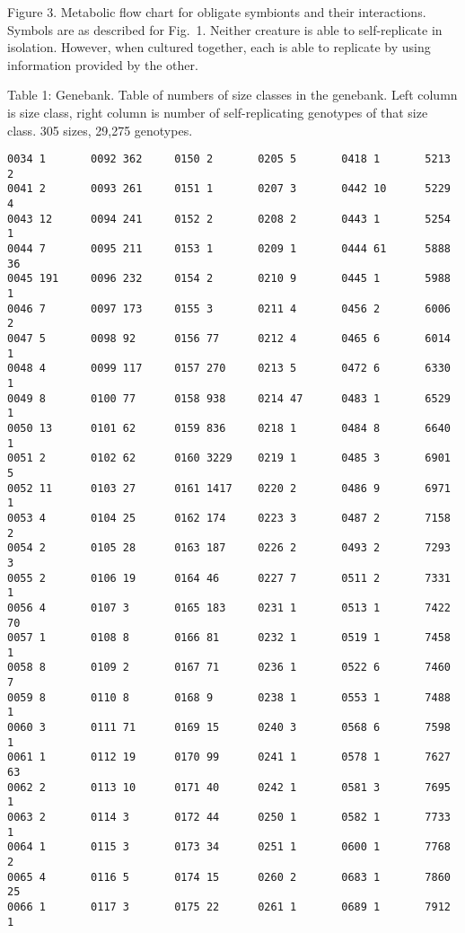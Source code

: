 \newpage
\addtocounter{page}{1}

Figure 3.  Metabolic flow chart for obligate symbionts and their interactions.
Symbols are as described for Fig.\ 1.  Neither creature is able to
self-replicate in isolation.  However, when cultured together, each is able to
replicate by using information provided by the other.

\newpage
\addtocounter{page}{1}

Table 1:  Genebank.  Table of numbers of size classes in the genebank.  Left
column is size class, right column is number of self-replicating genotypes
of that size class.  305 sizes, 29,275 genotypes.
\eLP

\begin{verbatim}
0034 1       0092 362     0150 2       0205 5       0418 1       5213 2
0041 2       0093 261     0151 1       0207 3       0442 10      5229 4
0043 12      0094 241     0152 2       0208 2       0443 1       5254 1
0044 7       0095 211     0153 1       0209 1       0444 61      5888 36
0045 191     0096 232     0154 2       0210 9       0445 1       5988 1
0046 7       0097 173     0155 3       0211 4       0456 2       6006 2
0047 5       0098 92      0156 77      0212 4       0465 6       6014 1
0048 4       0099 117     0157 270     0213 5       0472 6       6330 1
0049 8       0100 77      0158 938     0214 47      0483 1       6529 1
0050 13      0101 62      0159 836     0218 1       0484 8       6640 1
0051 2       0102 62      0160 3229    0219 1       0485 3       6901 5
0052 11      0103 27      0161 1417    0220 2       0486 9       6971 1
0053 4       0104 25      0162 174     0223 3       0487 2       7158 2
0054 2       0105 28      0163 187     0226 2       0493 2       7293 3
0055 2       0106 19      0164 46      0227 7       0511 2       7331 1
0056 4       0107 3       0165 183     0231 1       0513 1       7422 70
0057 1       0108 8       0166 81      0232 1       0519 1       7458 1
0058 8       0109 2       0167 71      0236 1       0522 6       7460 7
0059 8       0110 8       0168 9       0238 1       0553 1       7488 1
0060 3       0111 71      0169 15      0240 3       0568 6       7598 1
0061 1       0112 19      0170 99      0241 1       0578 1       7627 63
0062 2       0113 10      0171 40      0242 1       0581 3       7695 1
0063 2       0114 3       0172 44      0250 1       0582 1       7733 1
0064 1       0115 3       0173 34      0251 1       0600 1       7768 2
0065 4       0116 5       0174 15      0260 2       0683 1       7860 25
0066 1       0117 3       0175 22      0261 1       0689 1       7912 1

\end{verbatim}
